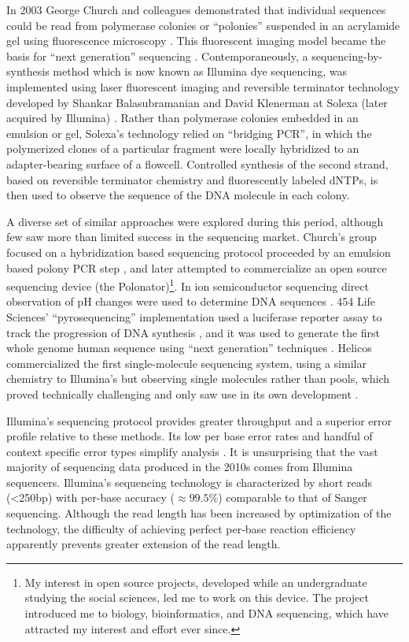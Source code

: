 \documentclass[a4paper,12pt,numbered,oneside]{Classes/PhDThesisPSnPDF}
\begin{document}
In 2003 George Church and colleagues demonstrated that individual sequences could be read from polymerase colonies or ``polonies'' suspended in an acrylamide gel using fluorescence microscopy \cite{mitra2003fluorescent}.
This fluorescent imaging model became the basis for ``next generation'' sequencing \cite{shendure2008next}.
Contemporaneously, a sequencing-by-synthesis method which is now known as Illumina dye sequencing, was implemented using laser fluorescent imaging and reversible terminator technology developed by Shankar Balasubramanian and David Klenerman at Solexa (later acquired by Illumina) \cite{balasubramanian2004arrayed, bentley2008accurate}.
Rather than polymerase colonies embedded in an emulsion or gel, Solexa's technology relied on ``bridging PCR'', in which the polymerized clones of a particular fragment were locally hybridized to an adapter-bearing surface of a flowcell.
Controlled synthesis of the second strand, based on reversible terminator chemistry \cite{canard1994dna} and fluorescently labeled dNTPs, is then used to observe the sequence of the DNA molecule in each colony.

A diverse set of similar approaches were explored during this period, although few saw more than limited success in the sequencing market.
Church's group focused on a hybridization based sequencing protocol proceeded by an emulsion based polony PCR step \cite{shendure2005accurate}, and later attempted to commercialize an open source sequencing device (the Polonator)\footnote{My interest in open source projects, developed while an undergraduate studying the social sciences, led me to work on this device. The project introduced me to biology, bioinformatics, and DNA sequencing, which have attracted my interest and effort ever since.}.
In ion semiconductor sequencing direct observation of pH changes were used to determine DNA sequences \cite{rusk2010torrents}.
454 Life Sciences' ``pyrosequencing'' implementation used a luciferase reporter assay to track the progression of DNA synthesis \cite{margulies2005genome}, and it was used to generate the first whole genome human sequence using ``next generation'' techniques \cite{wheeler2008complete}.
Helicos commercialized the first single-molecule sequencing system, using a similar chemistry to Illumina's but observing single molecules rather than pools, which proved technically challenging and only saw use in its own development \cite{harris2008single}.

Illumina's sequencing protocol provides greater throughput and a superior error profile relative to these methods.
Its low per base error rates and handful of context specific error types simplify analysis \cite{allhoff2013discovering}.
It is unsurprising that the vast majority of sequencing data produced in the 2010s comes from Illumina sequencers.
Illumina's sequencing technology is characterized by short reads (<250bp) with per-base accuracy ($\approx 99.5\%$) comparable to that of Sanger sequencing.
Although the read length has been increased by optimization of the technology, the difficulty of achieving perfect per-base reaction efficiency apparently prevents greater extension of the read length.
\end{document}
